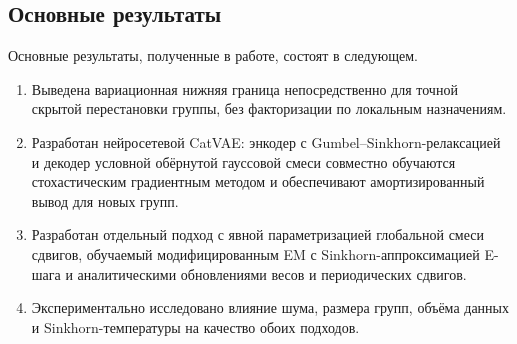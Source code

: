 \subsection{Основные результаты}

Основные результаты, полученные в работе, состоят в следующем.
\begin{enumerate}
  \item Выведена вариационная нижняя граница непосредственно для точной скрытой
  перестановки группы, без факторизации по локальным назначениям.
  \item Разработан нейросетевой CatVAE: энкодер с Gumbel--Sinkhorn-релаксацией и декодер
  условной обёрнутой гауссовой смеси совместно обучаются стохастическим градиентным методом
  и обеспечивают амортизированный вывод для новых групп.
  \item Разработан отдельный подход с явной параметризацией глобальной смеси сдвигов,
  обучаемый модифицированным EM с Sinkhorn-аппроксимацией E-шага и аналитическими
  обновлениями весов и периодических сдвигов.
  \item Экспериментально исследовано влияние шума, размера групп, объёма данных и
  Sinkhorn-температуры на качество обоих подходов.
\end{enumerate}
